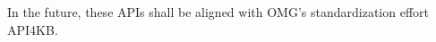 \documentclass[10pt,fleqn,%
\ifpretendfinal
final%
\else
draft%
\fi,
]{scrreprt}
\newcommand{\clause}[1]{\chapter{#1}}
\newcommand{\infannex}[1]{ \chapter{Annex (informative): #1} }
\newcommand\blankpage{%
    \null
    \thispagestyle{empty}%
    \addtocounter{page}{-1}%
    \newpage}
\begin{document}
In the future, these APIs shall be aligned with OMG's standardization
effort API4KB.


\newpage

\clearpage

 
\renewcommand{\bibname}{References}
\label{a:bibliography}



\newpage
\clearpage

\printindex
{}
\blankpage
\end{document}
